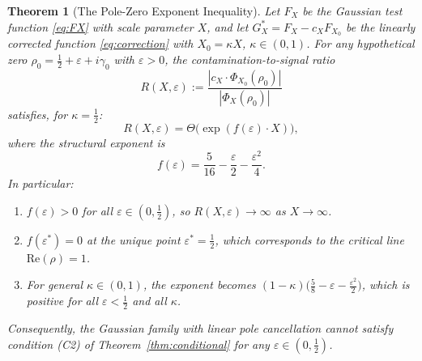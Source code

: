 \documentclass[12pt]{article}
\newtheorem{theorem}{Theorem}[section]
\theoremstyle{remark}
\begin{document}
\begin{theorem}[The Pole-Zero Exponent Inequality]\label{thm:wall}
Let $F_X$ be the Gaussian test function \eqref{eq:FX} with scale parameter
$X$, and let $G_X^* = F_X - c_X F_{X_0}$ be the linearly corrected function
\eqref{eq:correction} with $X_0 = \kappa X$, $\kappa \in (0,1)$. For any
hypothetical zero $\rho_0 = \tfrac{1}{2}+\varepsilon+i\gamma_0$ with
$\varepsilon > 0$, the contamination-to-signal ratio
\[
R(X,\varepsilon) := \frac{|c_X \cdot \Phi_{X_0}(\rho_0)|}{|\Phi_X(\rho_0)|}
\]
satisfies, for $\kappa = \tfrac{1}{2}$:
\begin{equation}\label{eq:R}
R(X,\varepsilon) = \Theta\bigl(\exp(f(\varepsilon) \cdot X)\bigr),
\end{equation}
where the \emph{structural exponent} is
\begin{equation}\label{eq:feps}
f(\varepsilon) = \frac{5}{16} - \frac{\varepsilon}{2}
  - \frac{\varepsilon^2}{4}.
\end{equation}
In particular:
\begin{enumerate}[\upshape (a)]
\item $f(\varepsilon) > 0$ for all $\varepsilon \in (0, \tfrac{1}{2})$,
  so $R(X,\varepsilon) \to \infty$ as $X \to \infty$.
\item $f(\varepsilon^*) = 0$ at the unique point
  $\varepsilon^* = \tfrac{1}{2}$, which corresponds to the critical line
  $\mathrm{Re}(\rho) = 1$.
\item For general $\kappa \in (0,1)$, the exponent becomes
  $(1-\kappa)\bigl(\tfrac{5}{8} - \varepsilon - \tfrac{\varepsilon^2}{2}\bigr)$,
  which is positive for all $\varepsilon < \tfrac{1}{2}$ and all $\kappa$.
\end{enumerate}

Consequently, the Gaussian family with linear pole cancellation cannot
satisfy condition \textup{(C2)} of Theorem~\ref{thm:conditional} for any
$\varepsilon \in (0,\tfrac{1}{2})$.
\end{theorem}
\end{document}
